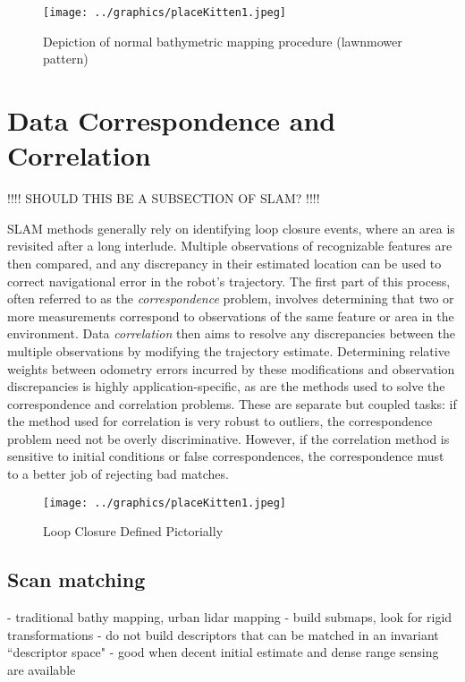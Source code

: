  \begin{figure}[htbp]
   \centering
   \texttt{[image: ../graphics/placeKitten1.jpeg]} %
   \caption{Depiction of normal bathymetric mapping procedure (lawnmower pattern)}
   \label{fig:BathyMapping}
\end{figure}


\section{Data Correspondence and Correlation}

!!!! SHOULD THIS BE A SUBSECTION OF SLAM? !!!!

SLAM methods generally rely on identifying loop closure events, where an area is revisited after a long interlude. Multiple observations of recognizable features are then compared, and any discrepancy in their estimated location can be used to correct navigational error in the robot's trajectory. The first part of this process, often referred to as the \emph{correspondence} problem, involves determining that two or more measurements correspond to observations of the same feature or area in the environment. Data \emph{correlation} then aims to resolve any discrepancies between the multiple observations by modifying the trajectory estimate. Determining relative weights between odometry errors incurred by these modifications and observation discrepancies is highly application-specific, as are the methods used to solve the correspondence and correlation problems. These are separate but coupled tasks: if the method used for correlation is very robust to outliers, the correspondence problem need not be overly discriminative. However, if the correlation method is sensitive to initial conditions or false correspondences, the correspondence must to a better job of rejecting bad matches. 

 \begin{figure}[htbp]
   \centering
   \texttt{[image: ../graphics/placeKitten1.jpeg]} %
   \caption{Loop Closure Defined Pictorially}
   \label{fig:LoopClosure}
\end{figure}

\subsection{Scan matching}

- traditional bathy mapping, urban lidar mapping
        - build submaps, look for rigid transformations 
        - do not build descriptors that can be matched in an invariant ``descriptor space"
	- good when decent initial estimate and dense range sensing are available

